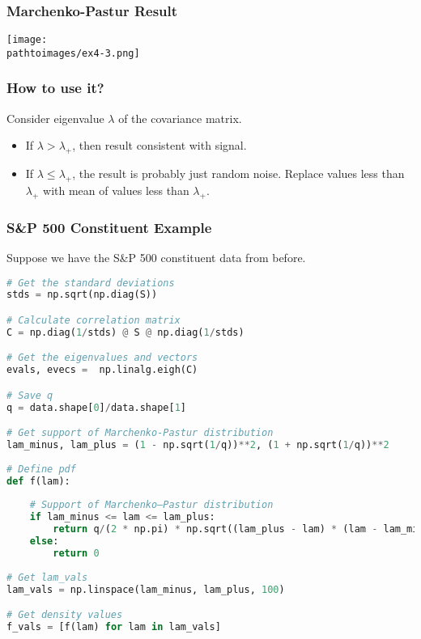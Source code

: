 \documentclass{beamer}
\newcommand{\pathtoimages}{/Users/charlesrambo/Desktop/Bootcamp24/Images}
\begin{document}
\begin{frame}[fragile]
\frametitle{Marchenko-Pastur Result}

\begin{center}
\texttt{[image: \\pathtoimages/ex4-3.png]}
\end{center}

\end{frame}

\begin{frame}
\frametitle{How to use it?}
Consider eigenvalue $\lambda$ of the covariance matrix.
\begin{itemize}
\item If $\lambda > \lambda_+$, then result consistent with signal. 
\item If $\lambda \leq \lambda_+$, the result is probably just random noise. Replace values less than $\lambda_+$ with mean of values less than $\lambda_+$.
\end{itemize}

\end{frame}

\begin{frame}[fragile]
\frametitle{S\&P 500 Constituent Example}
Suppose we have the S\&P 500 constituent data from before.
\begin{lstlisting}[language=Python]
# Get the standard deviations
stds = np.sqrt(np.diag(S))

# Calculate correlation matrix
C = np.diag(1/stds) @ S @ np.diag(1/stds)

# Get the eigenvalues and vectors
evals, evecs =  np.linalg.eigh(C)

# Save q
q = data.shape[0]/data.shape[1]

# Get support of Marchenko-Pastur distribution
lam_minus, lam_plus = (1 - np.sqrt(1/q))**2, (1 + np.sqrt(1/q))**2 
        
# Define pdf
def f(lam):
    
    # Support of Marchenko–Pastur distribution
    if lam_minus <= lam <= lam_plus:  
        return q/(2 * np.pi) * np.sqrt((lam_plus - lam) * (lam - lam_minus))/lam                
    else:       
        return 0
    
# Get lam_vals
lam_vals = np.linspace(lam_minus, lam_plus, 100)

# Get density values
f_vals = [f(lam) for lam in lam_vals]
\end{lstlisting}
\end{frame}
\end{document}
